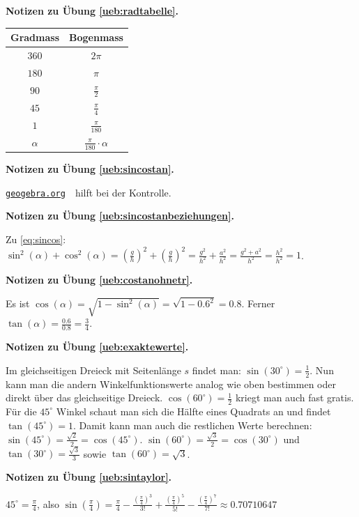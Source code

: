 \documentclass[%
11pt,%
twoside,%
titlepage,%
german,%
headsepline%
]{scrartcl}
\newcommand{\geogebralink}{\href{https://www.geogebra.org/calculator}{\texttt{geogebra.org}}}
\newcommand{\spaltenheight}{\rule{0mm}{3ex}}
\newcommand{\spaltensep}{\\[1ex]}
\newcommand{\concatueb}[1]{ueb:#1}%
\newcommand{\concatlsg}[1]{lsg:#1}%
\newenvironment{lsg}[1]{%
    \par\noindent\textbf{Notizen zu Übung \ref{\concatueb{#1}}.}%
    \label{\concatlsg{#1}}
}{%
    \par%
}
\begin{document}
\begin{lsg}{radtabelle}
\begin{center}
\small
\begin{tabular}{|c|c|}
\hline
\rowcolor{Gray}\spaltenheight \textbf{Gradmass} & \textbf{Bogenmass}\spaltensep\hline
\rowcolor{lightyellow}\spaltenheight $360$ & $2\pi$\spaltensep\hline
\rowcolor{Gray}\spaltenheight $180$ & $\pi$\spaltensep\hline
\rowcolor{lightyellow}\spaltenheight $90$ & $\frac{\pi}{2}$\spaltensep\hline
\rowcolor{Gray}\spaltenheight $45$ & $\frac{\pi}{4}$\spaltensep\hline
\rowcolor{lightyellow}\spaltenheight $1$ & $\frac{\pi}{180}$\spaltensep\hline
\rowcolor{Gray}\spaltenheight $\alpha$ & $\frac{\pi}{180}\cdot\alpha$\spaltensep\hline
\end{tabular}
\end{center}
\end{lsg}
\begin{lsg}{sincostan}
\geogebralink\ \ hilft bei der Kontrolle.
\end{lsg}
\begin{lsg}{sincostanbeziehungen}
Zu \eqref{eq:sincos}: $\sin^{2}(\alpha)+\cos^{2}(\alpha)=\left(\frac{g}{h}\right)^{2}+\left(\frac{g}{h}\right)^{2}=\frac{g^{2}}{h^{2}}+\frac{a^{2}}{h^{2}}=\frac{g^{2}+a^{2}}{h^{2}}=\frac{h^{2}}{h^{2}}=1$.
\end{lsg}
\begin{lsg}{costanohnetr}
Es ist $\cos(\alpha)=\sqrt{1-\sin^{2}(\alpha)}=\sqrt{1-0.6^{2}}=0.8$. Ferner $\tan(\alpha)=\frac{0.6}{0.8}=\frac{3}{4}$.
\end{lsg}
\begin{lsg}{exaktewerte}
Im gleichseitigen Dreieck mit Seitenl\"ange $s$ findet man: $\sin(30^{\circ})=\frac{1}{2}$. Nun kann man die andern Winkelfunktionswerte analog wie oben bestimmen oder direkt \"uber das gleichseitige Dreieck. $\cos(60^{\circ})=\frac{1}{2}$ kriegt man auch fast gratis. F\"ur die $45^{\circ}$ Winkel schaut man sich die H\"alfte eines Quadrats an und findet $\tan(45^{\circ})=1$. Damit kann man auch die restlichen Werte berechnen: $\sin(45^{\circ})=\frac{\sqrt{2}}{2}=\cos(45^{\circ})$. $\sin(60^{\circ})=\frac{\sqrt{3}}{2}=\cos(30^{\circ})$ und $\tan(30^{\circ})=\frac{\sqrt{3}}{3}$ sowie $\tan(60^{\circ})=\sqrt{3}$.
\end{lsg}
\begin{lsg}{sintaylor}
$45^{\circ}=\frac{\pi}{4}$, also $\sin(\frac{\pi}{4})=\frac{\pi}{4}-\frac{(\frac{\pi}{4})^{3}}{3!}+\frac{(\frac{\pi}{4})^{5}}{5!}-\frac{(\frac{\pi}{4})^{7}}{7!}\approx0.70710647$
\end{lsg}
\end{document}
